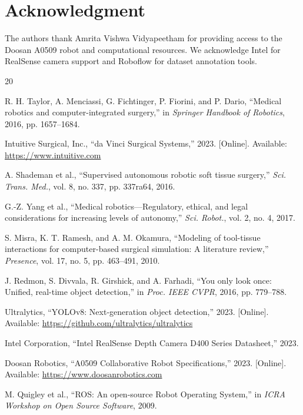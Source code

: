 \documentclass[journal]{IEEEtran}
\begin{document}
\section*{Acknowledgment}

The authors thank Amrita Vishwa Vidyapeetham for providing access to the Doosan A0509 robot and computational resources. We acknowledge Intel for RealSense camera support and Roboflow for dataset annotation tools.

\begin{thebibliography}{20}

R. H. Taylor, A. Menciassi, G. Fichtinger, P. Fiorini, and P. Dario, ``Medical robotics and computer-integrated surgery,'' in \textit{Springer Handbook of Robotics}, 2016, pp. 1657--1684.

Intuitive Surgical, Inc., ``da Vinci Surgical Systems,'' 2023. [Online]. Available: \url{https://www.intuitive.com}

A. Shademan et al., ``Supervised autonomous robotic soft tissue surgery,'' \textit{Sci. Trans. Med.}, vol. 8, no. 337, pp. 337ra64, 2016.

G.-Z. Yang et al., ``Medical robotics—Regulatory, ethical, and legal considerations for increasing levels of autonomy,'' \textit{Sci. Robot.}, vol. 2, no. 4, 2017.

S. Misra, K. T. Ramesh, and A. M. Okamura, ``Modeling of tool-tissue interactions for computer-based surgical simulation: A literature review,'' \textit{Presence}, vol. 17, no. 5, pp. 463--491, 2010.

J. Redmon, S. Divvala, R. Girshick, and A. Farhadi, ``You only look once: Unified, real-time object detection,'' in \textit{Proc. IEEE CVPR}, 2016, pp. 779--788.

Ultralytics, ``YOLOv8: Next-generation object detection,'' 2023. [Online]. Available: \url{https://github.com/ultralytics/ultralytics}

Intel Corporation, ``Intel RealSense Depth Camera D400 Series Datasheet,'' 2023.

Doosan Robotics, ``A0509 Collaborative Robot Specifications,'' 2023. [Online]. Available: \url{https://www.doosanrobotics.com}

M. Quigley et al., ``ROS: An open-source Robot Operating System,'' in \textit{ICRA Workshop on Open Source Software}, 2009.


\end{thebibliography}
\end{document}
